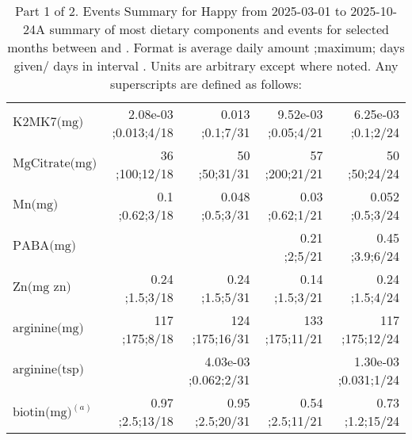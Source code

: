 \begin{table}[H]
\begin{tabular}{|l|r|r|r|r|}
$\textrm{K2MK7(mg)}$&2.08e-03 ;0.013;4/18&0.013 ;0.1;7/31&9.52e-03 ;0.05;4/21&6.25e-03 ;0.1;2/24\\
$\textrm{MgCitrate(mg)}$&36 ;100;12/18&50 ;50;31/31&57 ;200;21/21&50 ;50;24/24\\
$\textrm{Mn(mg)}$&0.1 ;0.62;3/18&0.048 ;0.5;3/31&0.03 ;0.62;1/21&0.052 ;0.5;3/24\\
$\textrm{PABA(mg)}$&&&0.21 ;2;5/21&0.45 ;3.9;6/24\\
$\textrm{Zn(mg~zn)}$&0.24 ;1.5;3/18&0.24 ;1.5;5/31&0.14 ;1.5;3/21&0.24 ;1.5;4/24\\
$\textrm{arginine(mg)}$&117 ;175;8/18&124 ;175;16/31&133 ;175;11/21&117 ;175;12/24\\
$\textrm{arginine(tsp)}$&&4.03e-03 ;0.062;2/31&&1.30e-03 ;0.031;1/24\\
$\textrm{biotin(mg)}^{\left(a\right)}$&0.97 ;2.5;13/18&0.95 ;2.5;20/31&0.54 ;2.5;11/21&0.73 ;1.2;15/24\\
\hline
\end{tabular}
\caption{Part 1 of 2.  Events Summary for Happy   from 2025-03-01 to 2025-10-24A summary of most dietary components and events  for selected months between \mjmdatemin and \mjmdatemax. Format is average daily amount ;maximum; days given/ days in interval . Units are arbitrary except where noted. Any  superscripts are defined as follows:  \mjmsuperscriptsn}
\end{table}
